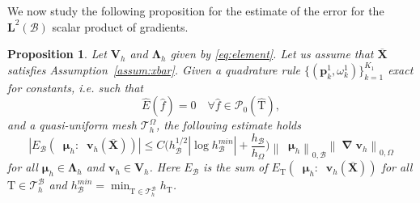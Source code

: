\documentclass[oneside]{amsart} %
\newcommand{\norm}[1]{\left\lVert#1\right\rVert}
\newcommand{\abs}[1]{\left\lvert#1\right\rvert}
\newtheorem{prop}{Proposition}
\DeclareMathOperator*{\Grad}{\boldsymbol\nabla}
\DeclareMathOperator{\grads}{\boldsymbol\nabla_s}
\newcommand\LdBd{\mathbf{L}^2(\B)} %
\newcommand\B{\mathcal B} %
\renewcommand\v{\mathbf{v}} %
\newcommand\X{\mathbf{X}} %
\newcommand\Xbar{\overline{\X}} %
\newcommand\LL{{\boldsymbol{\Lambda}}} %
\newcommand\Vline{\mathbf{V}} %
\newcommand\mmu{{\boldsymbol\mu}} %
\newcommand\T{\mathcal{T}} %
\newcommand\quadnode{\mathbf{p}}
\newcommand\quadweigth{\omega}
\newcommand\Pcal{\mathcal{P}}
\newcommand\tri{\mathrm{T}} %
\newcommand\reftri{\widehat{\tri}} %
\begin{document}
	We now study the following proposition for the estimate of the error for the $\LdBd$ scalar product of gradients.
	
	
	\begin{prop}\label{prop:l2grad_estimate}
		Let $\Vline_h$ and $\LL_h$ given by \eqref{eq:element}. Let us assume that $\Xbar$ satisfies Assumption~\ref{assum:xbar}.
		Given a quadrature rule $\{(\quadnode_k^1,\quadweigth_k^1)\}_{k=1}^{K_1}$ exact for constants, i.e. such that
		\begin{equation}
			\widehat{E}(\widehat{f}) = 0
			\quad\forall\widehat{f}\in\Pcal_0(\reftri),
		\end{equation}
		and a  quasi-uniform mesh  $\T_h^\Omega$, the following estimate holds
		\begin{equation}\label{eq:h1_quad_error}
			\abs{E_\B(\grads\mmu_h:\grads\v_h(\Xbar))}
			\le
			C\bigg( h_\B^{1/2}|\log h_\B^{min}| + \frac{h_\B}{h_\Omega} \bigg)
			\norm{\grads \mmu_h}_{0,\B}\norm{\Grad\v_h}_{0,\Omega}
		\end{equation}
		for all $\mmu_h\in\LL_h$ and $\v_h\in\Vline_h$. Here $E_\B$ is the sum of $E_\tri(\grads\mmu_h:\grads\v_h(\Xbar))$ for all $\tri\in\T_h^\B$ and  $h_\B^{min}=\min_{\tri\in\T_h^\B} h_\tri$. 
	\end{prop}
	
\end{document}
